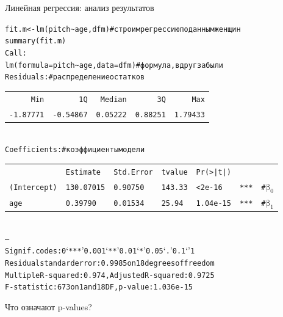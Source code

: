 \begin{frame}{Линейная регрессия: анализ результатов}
\scriptsize
\begin{alltt}
fit.m <- \alert{lm(pitch\textasciitilde age, dfm)} \hfill \# cтроим регрессию по данным женщин\\
\alert{summary(fit.m)}\bigskip\\
Call:\\
lm(formula = pitch \textasciitilde  age, data = dfm)\hfill \# формула, вдруг забыли \bigskip\\
Residuals: \hfill \# распределение остатков\\
\begin{tabular}{rrrrr}
Min & 1Q & Median &3Q & Max \\
-1.87771 & -0.54867 & 0.05222 & 0.88251 & 1.79433 \\
\end{tabular}
\bigskip\\
Coefficients:\hfill \# коэффициенты модели\\
\begin{tabular}{llllllr}
					 	& Estimate		& Std. Error	& t value	&Pr(>|t|)	&  		& \\
(Intercept)		& 130.07015	&   0.90750		&  143.33		&  < 2e-16 	& *** 	& \alert{\# $\mbox{β}_0$}\\
age   				& 0.39790		& 0.01534		& 25.94		& 1.04e-15	&***	&  \alert{\# $\mbox{β}_1$}\\
\end{tabular}
\\
---\\
Signif. codes:  0 ‘***’ 0.001 ‘**’ 0.01 ‘*’ 0.05 ‘.’ 0.1 ‘ ’ 1\medskip\\
Residual standard error: 0.9985 on 18 degrees of freedom\\
Multiple R-squared:  0.974,	\alert{Adjusted R-squared:  0.9725} \\
F-statistic:   673 on 1 and 18 DF,  p-value: 1.036e-15\\
\end{alltt}
\normalsize
\alert{Что означают p-values?}
\end{frame}
